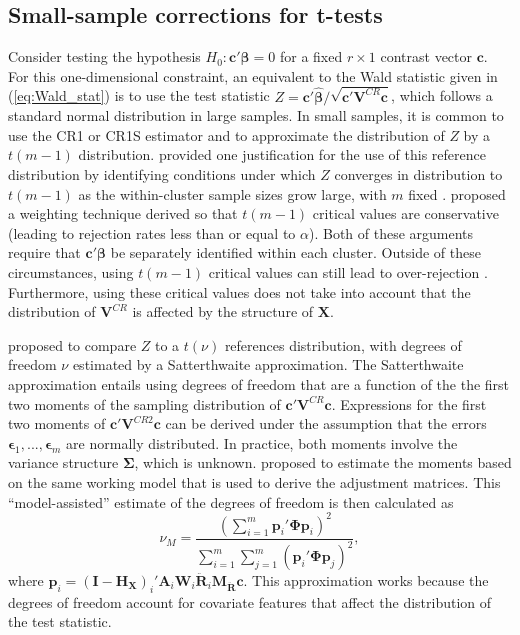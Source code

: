 \documentclass[12pt]{article}\usepackage[]{graphicx}\usepackage[]{color}
\newcommand{\E}{\text{E}}
\newcommand{\Var}{\text{Var}}
\newcommand{\bm}{\mathbf}
\newcommand{\bs}{\boldsymbol}
\begin{document}
\subsection{Small-sample corrections for t-tests}
\label{subsec:t-tests}

Consider testing the hypothesis $H_0: \bm{c}'\bs\beta = 0$ for a fixed $r \times 1$ contrast vector $\bm{c}$. 
For this one-dimensional constraint, an equivalent to the Wald statistic given in (\ref{eq:Wald_stat}) is to use the test statistic $Z = \bm{c}'\bs{\hat\beta} / \sqrt{\bm{c}'\bm{V}^{CR}\bm{c}}$, which follows a standard normal distribution in large samples. 
In small samples, it is common to use the CR1 or CR1S estimator and to approximate the distribution of $Z$ by a $t(m - 1)$ distribution. 
\citet{Hansen2007asymptotic} provided one justification for the use of this reference distribution by identifying conditions under which $Z$ converges in distribution to $t(m-1)$ as the within-cluster sample sizes grow large, with $m$ fixed \citep[see also][]{Donald2007inference}. 
\citet{Ibragimov2010tstatistic} proposed a weighting technique derived so that $t(m-1)$ critical values are conservative (leading to rejection rates less than or equal to $\alpha$).
Both of these arguments require that $\bm{c}'\bs\beta$ be separately identified within each cluster. 
Outside of these circumstances, using $t(m-1)$ critical values can still lead to over-rejection \citep{Cameron2015practitioners}. 
Furthermore, using these critical values does not take into account that the distribution of $\bm{V}^{CR}$ is affected by the structure of $\bm{X}$. 

\citet{Bell2002bias} proposed to compare $Z$ to a $t(\nu)$ references distribution, with degrees of freedom $\nu$ estimated by a Satterthwaite approximation.
The Satterthwaite approximation \citep{Satterthwaite1946approximate} entails using degrees of freedom that are a function of the the first two moments of the sampling distribution of $\bm{c}' \bm{V}^{CR} \bm{c}$.
Expressions for the first two moments of $\bm{c}'\bm{V}^{CR2}\bm{c}$ can be derived under the assumption that the errors $\bs\epsilon_1,...,\bs\epsilon_m$ are normally distributed. 
In practice, both moments involve the variance structure $\bs\Sigma$, which is unknown. 
\citet{Bell2002bias} proposed to estimate the moments based on the same working model that is used to derive the adjustment matrices. 
This ``model-assisted'' estimate of the degrees of freedom is then calculated as 
\begin{equation}
\label{eq:nu_model}
\nu_{M} = \frac{\left(\sum_{i=1}^m \bm{p}_i' \bs\Phi \bm{p}_i\right)^2}{\sum_{i=1}^m \sum_{j=1}^m \left(\bm{p}_i' \bs\Phi \bm{p}_j\right)^2},
\end{equation}
where $\bm{p}_i = \left(\bm{I} - \bm{H_X}\right)_i'\bm{A}_i \bm{W}_i\bm{\ddot{R}}_i\bm{M_{\ddot{R}}} \bm{c}$.
This approximation works because the degrees of freedom account for covariate features that affect the distribution of the test statistic. 
\end{document}
